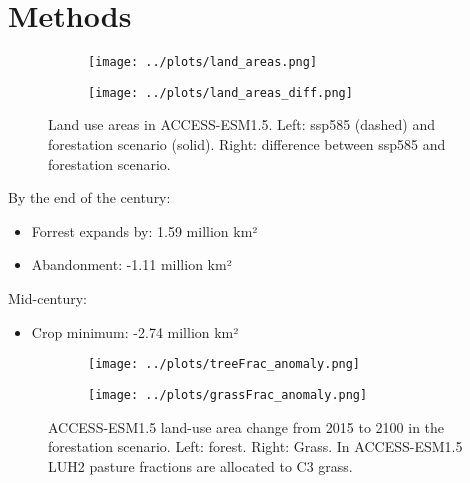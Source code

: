 \documentclass[]{article}
\begin{document}
\section{Methods}

\begin{figure}[H]
    \centering
    \begin{subfigure}[b]{0.45\linewidth}
        \texttt{[image: ../plots/land\_areas.png]}
    \end{subfigure}
    \begin{subfigure}[b]{0.45\linewidth}
        \texttt{[image: ../plots/land\_areas\_diff.png]}
    \end{subfigure}
    \caption{Land use areas in ACCESS-ESM1.5. Left: ssp585 (dashed) and forestation scenario (solid). Right: difference between ssp585 and forestation scenario.}
    \label{fig:land_use}
\end{figure}

By the end of the century:
\begin{itemize}
    \item Forrest expands by: 1.59 million km²
    \item Abandonment: -1.11 million km²
\end{itemize}
Mid-century:
\begin{itemize}
    \item Crop minimum: -2.74 million km²
\end{itemize}

\begin{figure}[H]
    \centering
    \begin{subfigure}[b]{0.45\linewidth}
        \texttt{[image: ../plots/treeFrac\_anomaly.png]}
    \end{subfigure}
    \begin{subfigure}[b]{0.45\linewidth}
        \texttt{[image: ../plots/grassFrac\_anomaly.png]}
    \end{subfigure}
    \caption{ACCESS-ESM1.5 land-use area change from 2015 to 2100 in the forestation scenario. Left: forest. Right: Grass. In ACCESS-ESM1.5 LUH2 pasture fractions are allocated to C3 grass.}
    \label{fig:land_use_map}
\end{figure}
\end{document}
